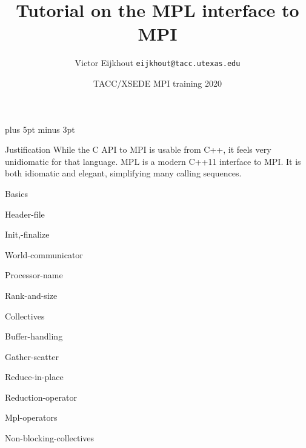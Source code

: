 \documentclass[11pt,headernav]{beamer}
\newcounter{tacc}
\def\Location{}%
\def\courseyear{2020}
\def\Location{TACC APP institute MPI training \courseyear}
\def\Location{TACC/XSEDE MPI training \courseyear}
\begin{document}
\parskip=10pt plus 5pt minus 3pt

\title{Tutorial on the MPL interface to MPI}
\author{Victor Eijkhout {\tt eijkhout@tacc.utexas.edu}}
\date{\Location}

\begin{frame}
  \titlepage
\end{frame}

\begin{xsede}
  
\end{xsede}

\begin{frame}{Justification}
  While the C API to MPI is usable from C++, it feels very unidiomatic
  for that language.
  MPL is a modern C++11 interface to MPI.
  It is both idiomatic and elegant, simplifying many calling sequences.
\end{frame}

 {Basics}

\begin{frame}[containsverbatim]{Header-file}
  
\end{frame}
\begin{frame}[containsverbatim]{Init,-finalize}
  
\end{frame}
\begin{frame}[containsverbatim]{World-communicator}
  
\end{frame}
\begin{frame}[containsverbatim]{Processor-name}
  
\end{frame}
\begin{frame}[containsverbatim]{Rank-and-size}
  
\end{frame}

 {Collectives}

\begin{frame}[containsverbatim]{Buffer-handling}
  
\end{frame}

\begin{frame}[containsverbatim]{Gather-scatter}
  
\end{frame}
\begin{frame}[containsverbatim]{Reduce-in-place}
  \footnotesize
  
\end{frame}
\begin{frame}[containsverbatim]{Reduction-operator}
  
\end{frame}
\begin{frame}[containsverbatim]{Mpl-operators}
  
\end{frame}
\begin{frame}[containsverbatim]{Non-blocking-collectives}
  
\end{frame}
\end{document}
